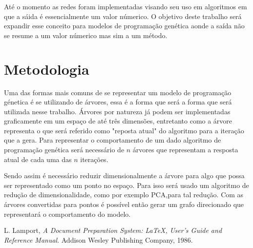 \documentclass{sbrt}
\begin{document}
Até o momento as redes foram implementadas visando seu uso em algoritmos em que a sáida é essencialmente 
um valor númerico.  O objetivo deste trabalho será expandir esse conceito para modelos de programação 
genética aonde a saída não se resume a um valor númerico mas sim a um método.

\section{Metodologia}

Uma das formas mais comuns de se representar um modelo de programação génetica é se utilizando de árvores, essa é a forma que 
será a forma que será utilizada nesse trabalho. Árvores por natureza já podem ser implementadas graficamente em um espaço de 
até três dimensões, entretanto como a árvore representa o que será referido como "reposta atual" do algoritmo para a iteração que 
a gera. Para representar o comportamento de um dado algoritmo de programação genética será necessário de \(n\) árvores que representam
a resposta atual de cada uma das \(n\) iterações.

Sendo assim é necessário reduzir dimensionalmente a árvore para algo que possa ser representado como um ponto no espaço. Para isso será usado
um algoritmo de redução de dimensionalidade, como por exemplo PCA,para tal redução. Com as árvores convertidas para pontos é possível então gerar
um grafo direcionado que representará o comportamento do modelo. 


\begin{thebibliography}{99}
 L. Lamport, \textit{A Document Preparation System: \LaTeX, User's
Guide and Reference Manual}. Addison Wesley Publishing Company,
1986.
\end{thebibliography}


\end{document}
